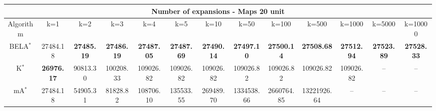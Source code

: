 \begin{tabular}{c|cccccccccccc}\toprule
\multicolumn{13}{c}{Number of expansions - Maps 20 unit}\\ \midrule
Algorithm & k=1 & k=2 & k=3 & k=4 & k=5 & k=10 & k=50 & k=100 & k=500 & k=1000 & k=5000 & k=10000 \\ \midrule
BELA$^*$ & 27484.18 & \textbf{27485.19} & \textbf{27486.19} & \textbf{27487.05} & \textbf{27487.69} & \textbf{27490.14} & \textbf{27497.10} & \textbf{27500.14} & \textbf{27508.68} & \textbf{27512.94} & \textbf{27523.89} & \textbf{27528.33} \\
K$^*$ & \textbf{26976.17} & 90813.30 & 100208.33 & 109026.82 & 109026.82 & 109026.82 & 109026.82 & 109026.82 & 109026.82 & 109026.82 & -- & -- \\
mA$^*$ & 27484.18 & 54905.31 & 81828.82 & 108706.10 & 135533.55 & 269489.70 & 1334538.66 & 2660764.85 & 13221926.64 & -- & -- & -- \\ \bottomrule 
\end{tabular}
